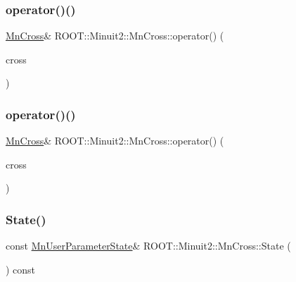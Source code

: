 \mbox{\label{classROOT_1_1Minuit2_1_1MnCross_a12f4058d5a3b758cbaa68a0a9bc0cebb}} 
\subsubsection{\texorpdfstring{operator()()}{operator()()}\hspace{0.1cm}{\footnotesize\ttfamily [1/2]}}
{\footnotesize\ttfamily \mbox{\hyperlink{classROOT_1_1Minuit2_1_1MnCross}{Mn\+Cross}}\& R\+O\+O\+T\+::\+Minuit2\+::\+Mn\+Cross\+::operator() (\begin{DoxyParamCaption}\item[{const \mbox{\hyperlink{classROOT_1_1Minuit2_1_1MnCross}{Mn\+Cross}} \&}]{cross }\end{DoxyParamCaption})\hspace{0.3cm}{\ttfamily [inline]}}

\mbox{\label{classROOT_1_1Minuit2_1_1MnCross_a12f4058d5a3b758cbaa68a0a9bc0cebb}} 
\subsubsection{\texorpdfstring{operator()()}{operator()()}\hspace{0.1cm}{\footnotesize\ttfamily [2/2]}}
{\footnotesize\ttfamily \mbox{\hyperlink{classROOT_1_1Minuit2_1_1MnCross}{Mn\+Cross}}\& R\+O\+O\+T\+::\+Minuit2\+::\+Mn\+Cross\+::operator() (\begin{DoxyParamCaption}\item[{const \mbox{\hyperlink{classROOT_1_1Minuit2_1_1MnCross}{Mn\+Cross}} \&}]{cross }\end{DoxyParamCaption})\hspace{0.3cm}{\ttfamily [inline]}}

\mbox{\label{classROOT_1_1Minuit2_1_1MnCross_a97ba8e698ee948a842f0ebe198c0d528}} 
\subsubsection{\texorpdfstring{State()}{State()}\hspace{0.1cm}{\footnotesize\ttfamily [1/2]}}
{\footnotesize\ttfamily const \mbox{\hyperlink{classROOT_1_1Minuit2_1_1MnUserParameterState}{Mn\+User\+Parameter\+State}}\& R\+O\+O\+T\+::\+Minuit2\+::\+Mn\+Cross\+::\+State (\begin{DoxyParamCaption}{ }\end{DoxyParamCaption}) const\hspace{0.3cm}{\ttfamily [inline]}}

